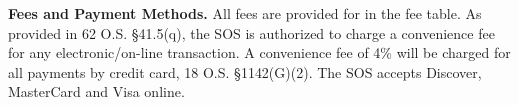 \textbf{Fees and Payment Methods.}
All fees are provided for in the fee table. As provided in 62 O.S. \S41.5(q), the
SOS is authorized to charge a convenience fee for any electronic/on-line
transaction. A convenience fee of 4\% will be charged for all payments by credit
card, 18 O.S. \S1142(G)(2). The SOS accepts Discover, MasterCard and Visa online.